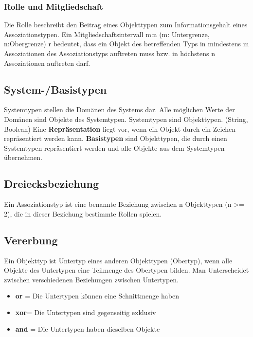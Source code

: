 \documentclass[a4paper,10pt]{scrartcl}
\begin{document}
\subsubsection{Rolle und Mitgliedschaft}
Die Rolle beschreibt den Beitrag eines Objekttypen zum Informationsgehalt eines Assoziationstypen. Ein Mitgliedschaftsintervall m:n (m: Untergrenze, n:Obergrenze) r bedeutet, dass ein Objekt des betreffenden Typs in mindestens m Assoziationen des Assoziationstyps auftreten muss bzw. in höchstens n Assoziationen auftreten darf.
\subsection{System-/Basistypen}
Systemtypen stellen die Domänen des Systems dar. Alle möglichen Werte der Domänen sind Objekte des Systemtypen. 
Systemtypen sind Objekttypen. (String, Boolean)\newline  
Eine \textbf{Repräsentation} liegt vor, wenn ein Objekt durch ein Zeichen repräsentiert werden kann.  
\textbf{Basistypen} sind Objekttypen, die durch einen Systemtypen repräsentiert werden und alle Objekte aus dem Systemtypen übernehmen.
\subsection{Dreiecksbeziehung}
Ein Assoziationstyp ist eine benannte Beziehung zwischen n Objekttypen (n >= 2), die in dieser Beziehung bestimmte Rollen spielen.

\subsection{Vererbung}
Ein Objekttyp ist Untertyp eines anderen Objekttypen (Obertyp), wenn alle Objekte des Untertypen eine Teilmenge des Obertypen bilden. Man Unterscheidet zwischen verschiedenen Beziehungen zwischen Untertypen.
\begin{itemize}
    \item \textbf{or} = Die Untertypen können eine Schnittmenge haben
    \item \textbf{xor}= Die Untertypen sind gegenseitig exklusiv
    \item \textbf{and} = Die Untertypen haben dieselben Objekte
\end{itemize}
\end{document}
